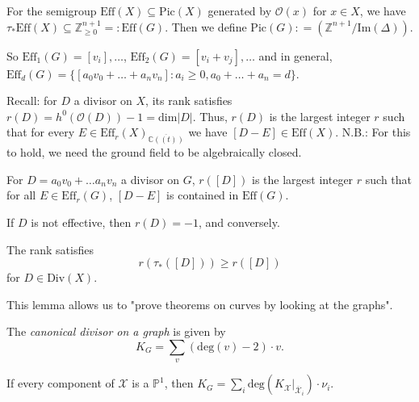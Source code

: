 \begin{definition} For the semigroup $\mathrm{Eff}(X) \subseteq \mathrm{Pic}(X)$ generated by $\mathcal{O}(x)$ for $x \in X$, we have $\tau_{*}\mathrm{Eff}(X) \subseteq \mathbb{Z}^{n+1}_{\geq 0} = \colon \mathrm{Eff}(G)$. Then we define $\mathrm{Pic}(G) \colon = (\mathbb{Z}^{n+1}/\mathrm{Im}(\Delta))$.

So $\mathrm{Eff}_1(G) = [v_i],\ldots$, $\mathrm{Eff}_2(G) = [v_i + v_j], \ldots$ and in general, $\mathrm{Eff}_d(G) = \{ [a_0 v_0 + \ldots + a_nv_n] \colon a_i\geq 0, a_0 + \ldots + a_n = d \}$. \end{definition}

\begin{remark} Recall: for $D$ a divisor on $X$, its rank satisfies $r(D) = h^0(\mathcal{O}(D)) - 1 = \mathrm{dim}|D|$. Thus, $r(D)$ is the largest integer $r$ such that for every $E \in \mathrm{Eff}_r(X)_{\overline{\mathbb{C}((t))}}$ we have $[D-E] \in \mathrm{Eff}(X)$. N.B.: For this to hold, we need the ground field to be algebraically closed.\end{remark}

\begin{definition} For $D = a_0v_0 + \ldots a_n v_n$ a divisor on $G$, $r([D])$ is the largest integer $r$ such that for all $E \in \mathrm{Eff}_r(G)$, $[D-E]$ is contained in $\mathrm{Eff}(G)$. \end{definition}

\begin{remark} If $D$ is not effective, then $r(D) = -1$, and conversely. \end{remark}

\begin{lemma} The rank satisfies $$r(\tau_{*}([D])) \geq r([D])$$ for $D \in \mathrm{Div}(X)$.\end{lemma}
This lemma allows us to "prove theorems on curves by looking at the graphs".

\begin{definition}[S.W. Zhang, 1990] The \emph{canonical divisor on a graph} is given by $$K_G = \sum_v (\mathrm{deg}(v)-2)\cdot v.$$ \end{definition}

\begin{remark} If every component of $\mathcal{X}$ is a $\mathbb{P}^1$, then $K_G = \sum_i \mathrm{deg}(K_{\mathcal{X}}|_{\overline{\mathcal{X}}_i})\cdot \nu_i$. \end{remark}

